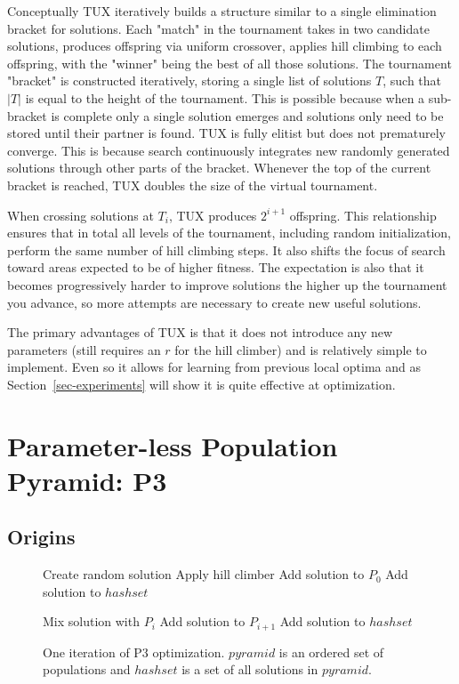 \documentclass{sig-alternate}
\begin{document}
Conceptually TUX iteratively builds a structure similar to a single elimination
bracket for solutions. Each "match" in the tournament takes in two candidate solutions,
produces offspring via uniform crossover, applies hill climbing to each offspring, with
the "winner" being the best of all those solutions. The tournament "bracket" is constructed
iteratively, storing a single list of solutions $T$, such that $|T|$ is equal to the height
of the tournament. This is possible because when a sub-bracket is complete only a single solution
emerges and solutions only need to be stored until their partner is found.
TUX is fully elitist but does not prematurely converge. This is because search continuously
integrates new randomly generated solutions through other parts of the bracket. Whenever the
top of the current bracket is reached, TUX doubles the size of the virtual tournament.

When crossing solutions at $T_i$, TUX produces $2^{i+1}$ offspring. This relationship
ensures that in total all levels of the tournament, including random initialization,
perform the same number of hill climbing steps. It also shifts the focus of search toward
areas expected to be of higher fitness. The expectation is also that it becomes progressively
harder to improve solutions the higher up the tournament you advance, so more attempts
are necessary to create new useful solutions.

The primary advantages of TUX is that it does not introduce any new parameters (still
requires an $r$ for the hill climber) and is relatively simple to implement. Even so
it allows for learning from previous local optima and as Section~\ref{sec-experiments}
will show it is quite effective at optimization.

\section{Parameter-less Population Pyramid: P3}
\subsection{Origins}
\begin{figure}
  \begin{algorithmic}
    \State Create random solution
    \State Apply hill climber
      \State Add solution to $P_0$
      \State Add solution to $hashset$
    \EndIf

      \State Mix solution with $P_i$
          \State Add solution to $P_{i+1}$
          \State Add solution to $hashset$
        \EndIf
      \EndIf
    \EndFor
  \EndProcedure
\end{algorithmic}
  \caption{One iteration of P3 optimization. $pyramid$ is an
           ordered set of populations and $hashset$ is a set
           of all solutions in $pyramid$.}
  \label{fig-p3}
\end{figure}
\end{document}

